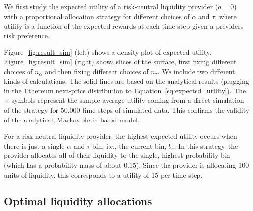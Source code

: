 \documentclass[sigconf, usenames, dvipsnames]{acmart}
\begin{document}
We first study the expected utility of a risk-neutral liquidity provider ($a=0$) with a proportional allocation strategy for different choices of $\alpha$ and $\tau$, where utility is a function of the expected rewards at each time step given a providers risk preference. 

Figure~\ref{fig:result_sim} (left) shows a density plot of  expected utility.  Figure~\ref{fig:result_sim} (right) shows slices of the surface, first fixing different choices of $n_{\alpha}$ and then fixing different choices of $n_{\tau}$.
We include two different kinds of calculations. The solid lines are based on the analytical results (plugging in the Ethereum next-price distribution to Equation~\ref{eq:expected_utility}). The $\times$ symbols  represent the sample-average utility coming from a direct simulation of the strategy for 50,000 time steps of simulated data. This confirms the validity of the analytical, Markov-chain based model.

For a risk-neutral liquidity provider, the highest expected utility occurs when there is just a single $\alpha$ and $\tau$ bin, i.e., the current bin, $b_s$. In this strategy, the provider allocates all of their liquidity to the single, highest probability bin (which has a probability mass of about $0.15$). Since the provider is allocating 100 units of liquidity, this corresponds to a utility of 15 per time step. 





\subsection{Optimal liquidity allocations}
\end{document}
